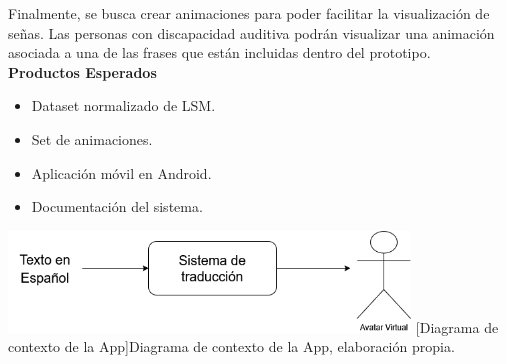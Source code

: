 
Finalmente, se busca crear animaciones para poder facilitar la visualización de señas. Las personas con discapacidad auditiva podrán visualizar una animación asociada a una de las frases que están incluidas dentro del prototipo.\\

\textbf{Productos Esperados}
\begin{itemize}
    \item Dataset normalizado de LSM.
    \item Set de animaciones.
    \item Aplicación móvil en Android.
    \item Documentación del sistema.\\
\end{itemize}

\begin{center}
    \includegraphics[width=0.8\textwidth]{Images/Cap 1/diacajanegra.png}
    [Diagrama de contexto de la App]{Diagrama de contexto de la App, elaboración propia.}
\end{center}

\newpage
